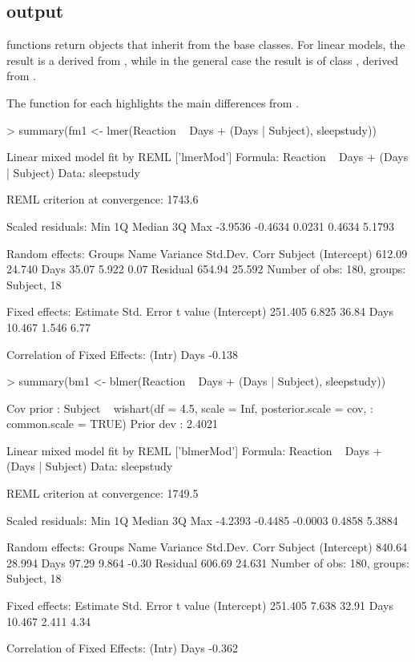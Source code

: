 \documentclass[article,shortnames]{jss}
\begin{document}
\subsection[blme output]{ output}

 functions return objects that inherit from the 
base classes. For linear models, the result is a 
derived from , while in the general case the result is
of class , derived from .

The  function for each highlights the main
differences from .

\begin{CodeChunk}
\begin{CodeInput}
> summary(fm1 <- lmer(Reaction ~ Days + (Days | Subject), sleepstudy))
\end{CodeInput}
\begin{CodeOutput}
Linear mixed model fit by REML ['lmerMod']
Formula: Reaction ~ Days + (Days | Subject)
   Data: sleepstudy

REML criterion at convergence: 1743.6

Scaled residuals: 
    Min      1Q  Median      3Q     Max 
-3.9536 -0.4634  0.0231  0.4634  5.1793 

Random effects:
 Groups   Name        Variance Std.Dev. Corr
 Subject  (Intercept) 612.09   24.740       
          Days         35.07    5.922   0.07
 Residual             654.94   25.592       
Number of obs: 180, groups:  Subject, 18

Fixed effects:
            Estimate Std. Error t value
(Intercept)  251.405      6.825   36.84
Days          10.467      1.546    6.77

Correlation of Fixed Effects:
     (Intr)
Days -0.138
\end{CodeOutput}
\begin{CodeInput}
> summary(bm1 <- blmer(Reaction ~ Days + (Days | Subject), sleepstudy))
\end{CodeInput}
\begin{CodeOutput}
Cov prior  : Subject ~ wishart(df = 4.5, scale = Inf, posterior.scale = cov,
           : common.scale = TRUE)
Prior dev  : 2.4021

Linear mixed model fit by REML ['blmerMod']
Formula: Reaction ~ Days + (Days | Subject)
   Data: sleepstudy

REML criterion at convergence: 1749.5

Scaled residuals: 
    Min      1Q  Median      3Q     Max 
-4.2393 -0.4485 -0.0003  0.4858  5.3884 

Random effects:
 Groups   Name        Variance Std.Dev. Corr 
 Subject  (Intercept) 840.64   28.994        
          Days         97.29    9.864   -0.30
 Residual             606.69   24.631        
Number of obs: 180, groups:  Subject, 18

Fixed effects:
            Estimate Std. Error t value
(Intercept)  251.405      7.638   32.91
Days          10.467      2.411    4.34

Correlation of Fixed Effects:
     (Intr)
Days -0.362
\end{CodeOutput}
\end{CodeChunk}
\end{document}

